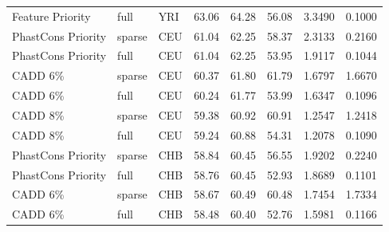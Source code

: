 \documentclass[11pt]{article}
\begin{document}
\begin{table}
\begin{tabular}{lll|crr|cc}
  Feature Priority &              full &          YRI &                        63.06 &             64.28 &            56.08 &                                 3.3490 &                                0.1000 \\
PhastCons Priority &            sparse &          CEU &                        61.04 &             62.25 &            58.37 &                                 2.3133 &                                0.2160 \\
PhastCons Priority &              full &          CEU &                        61.04 &             62.25 &            53.95 &                                 1.9117 &                                0.1044 \\
          CADD 6\% &            sparse &          CEU &                        60.37 &             61.80 &            61.79 &                                 1.6797 &                                1.6670 \\
          CADD 6\% &              full &          CEU &                        60.24 &             61.77 &            53.99 &                                 1.6347 &                                0.1096 \\
          CADD 8\% &            sparse &          CEU &                        59.38 &             60.92 &            60.91 &                                 1.2547 &                                1.2418 \\
          CADD 8\% &              full &          CEU &                        59.24 &             60.88 &            54.31 &                                 1.2078 &                                0.1090 \\
PhastCons Priority &            sparse &          CHB &                        58.84 &             60.45 &            56.55 &                                 1.9202 &                                0.2240 \\
PhastCons Priority &              full &          CHB &                        58.76 &             60.45 &            52.93 &                                 1.8689 &                                0.1101 \\
          CADD 6\% &            sparse &          CHB &                        58.67 &             60.49 &            60.48 &                                 1.7454 &                                1.7334 \\
          CADD 6\% &              full &          CHB &                        58.48 &             60.40 &            52.76 &                                 1.5981 &                                0.1166 \\

\end{tabular}
\end{table}
\end{document}
